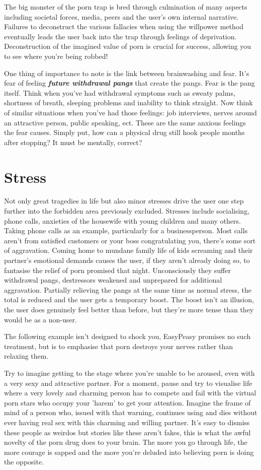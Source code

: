 \documentclass[easypeasy.tex]{subfiles}
\begin{document}
The big monster of the porn trap is bred through culmination of many aspects including societal forces, media, peers and the user's own internal narrative. Failures to deconstruct the various fallacies when using the willpower method eventually leads the user back into the trap through feelings of deprivation. Deconstruction of the imagined value of porn is crucial for success, allowing you to see where you're being robbed!

One thing of importance to note is the link between brainwashing and fear. It's fear of feeling \textit{\textbf{future withdrawal pangs}} that create the pangs. Fear is the pang itself. Think when you've had withdrawal symptoms such as sweaty palms, shortness of breath, sleeping problems and inability to think straight. Now think of similar situations when you've had those feelings: job interviews, nerves around an attractive person, public speaking, ect. These are the same anxious feelings the fear causes. Simply put, how can a physical drug still hook people months after stopping? It must be mentally, correct?

\section{Stress}

Not only great tragedies in life but also minor stresses drive the user one step further into the forbidden area previously excluded. Stresses include socialising, phone calls, anxieties of the housewife with young children and many others. Taking phone calls as an example, particularly for a businessperson. Most calls aren't from satisfied customers or your boss congratulating you, there's some sort of aggravation. Coming home to mundane family life of kids screaming and their partner's emotional demands causes the user, if they aren't already doing so, to fantasise the relief of porn promised that night. Unconsciously they suffer withdrawal pangs, destressors weakened and unprepared for additional aggravation. Partially relieving the pangs at the same time as normal stress, the total is reduced and the user gets a temporary boost. The boost isn't an illusion, the user does genuinely feel better than before, but they're more tense than they would be as a non-user.

The following example isn't designed to shock you, EasyPeasy promises no such treatment, but is to emphasise that porn destroys your nerves rather than relaxing them.

Try to imagine getting to the stage where you're unable to be aroused, even with a very sexy and attractive partner. For a moment, pause and try to visualise life where a very lovely and charming person has to compete and fail with the virtual porn stars who occupy your 'harem' to get your attention. Imagine the frame of mind of a person who, issued with that warning, continues using and dies without ever having real sex with this charming and willing partner. It's easy to dismiss these people as weirdos but stories like these aren't fakes, this is what the awful novelty of the porn drug does to your brain. The more you go through life, the more courage is sapped and the more you're deluded into believing porn is doing the opposite.
\end{document}
